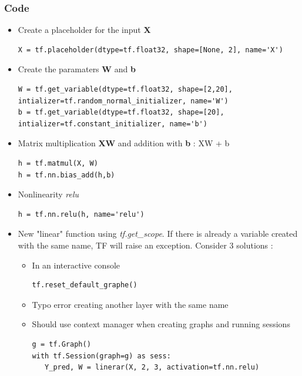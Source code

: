 \documentclass[12pt,a4paper]{article}
\begin{document}
\begin{itemize}
\subsubsection{Code}
\begin{itemize}
\item Create a placeholder for the input \textbf{X}
\begin{lstlisting}
X = tf.placeholder(dtype=tf.float32, shape=[None, 2], name='X')
\end{lstlisting}
\item Create the paramaters \textbf{W} and \textbf{b}
\begin{lstlisting}
W = tf.get_variable(dtype=tf.float32, shape=[2,20], intializer=tf.random_normal_initializer, name='W')
b = tf.get_variable(dtype=tf.float32, shape=[20], intializer=tf.constant_initializer, name='b')
\end{lstlisting}
\item Matrix multiplication \textbf{XW} and addition with \textbf{b} : XW + b
\begin{lstlisting}
h = tf.matmul(X, W)
h = tf.nn.bias_add(h,b)
\end{lstlisting}
\item Nonlinearity \textit{relu}
\begin{lstlisting}
h = tf.nn.relu(h, name='relu')
\end{lstlisting}
\item New "linear" function using \textit{tf.get\_scope}. If there is already a variable created with the same name, TF will raise an exception. Consider 3 solutions :
\begin{itemize}
\item In an interactive console
\begin{lstlisting}
tf.reset_default_graphe()
\end{lstlisting}
\item Typo error creating another layer with the same name
\item Should use context manager when creating graphs and running sessions
\begin{lstlisting}
g = tf.Graph()
with tf.Session(graph=g) as sess:
   Y_pred, W = linerar(X, 2, 3, activation=tf.nn.relu)
\end{lstlisting}
\end{itemize}
\end{itemize}
\end{itemize}
\end{document}
